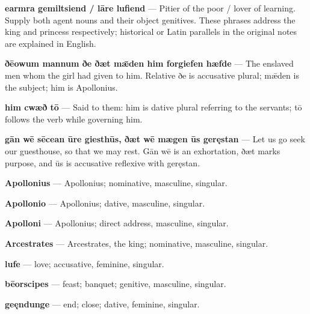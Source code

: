 \textbf{earmra gemiltsiend /\allowbreak{} lāre lufiend} — Pitier of the poor /\allowbreak{} lover of learning. Supply both agent nouns and their object genitives. These phrases address the king and princess respectively; historical or Latin parallels in the original notes are explained in English.

\textbf{ðēowum mannum ðe ðæt mǣden him forgiefen hæfde} — The enslaved men whom the girl had given to him. Relative ðe is accusative plural; mǣden is the subject; him is Apollonius.

\textbf{him cwæð tō} — Said to them: him is dative plural referring to the servants; tō follows the verb while governing him.

\textbf{gān wē sēcean ūre giesthūs, ðæt wē mægen ūs geręstan} — Let us go seek our guesthouse, so that we may rest. Gān wē is an exhortation, ðæt marks purpose, and ūs is accusative reflexive with geręstan.

\textbf{Apollonius} — Apollonius; nominative, masculine, singular.

\textbf{Apollonio} — Apollonius; dative, masculine, singular.

\textbf{Apolloni} — Apollonius; direct address, masculine, singular.

\textbf{Arcestrates} — Arcestrates, the king; nominative, masculine, singular.

\textbf{lufe} — love; accusative, feminine, singular.

\textbf{bēorscipes} — feast; banquet; genitive, masculine, singular.

\textbf{geęndunge} — end; close; dative, feminine, singular.


